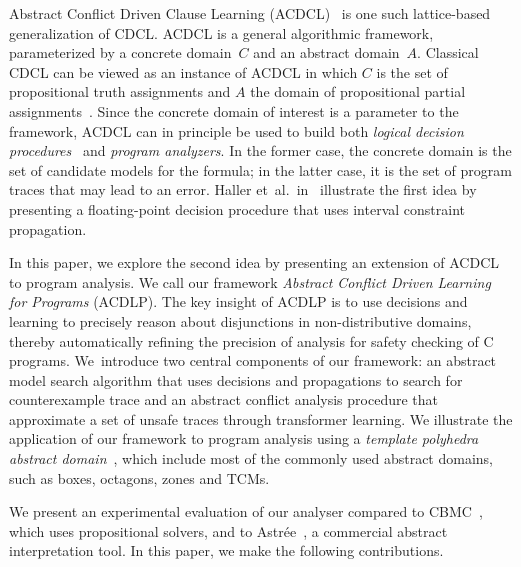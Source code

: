 Abstract Conflict Driven Clause Learning (ACDCL)~\cite{dhk2013-popl} is one
such lattice-based generalization of CDCL.  ACDCL is a general algorithmic
framework, parameterized by a concrete domain~$C$ and an abstract
domain~$A$.  Classical CDCL can be viewed as an instance of ACDCL in which
$C$ is the set of propositional truth assignments and $A$ the domain of
propositional partial assignments~\cite{leo-thesis}.  Since the concrete
domain of interest is a parameter to the framework, ACDCL can in principle
be used to build both \emph{logical decision
procedures}~\cite{DBLP:journals/fmsd/BrainDGHK14} and \emph{program
analyzers}.  In the former case, the concrete domain is the set of candidate
models for the formula; in the latter case, it is the set of program traces
that may lead to an error.  Haller
et~al.~in~\cite{DBLP:journals/fmsd/BrainDGHK14} illustrate the first idea by
presenting a floating-point decision procedure that uses interval constraint
propagation.


In this paper, we explore the second idea by presenting an extension of 
ACDCL to program analysis.  We call our 
framework \emph{Abstract Conflict Driven Learning for Programs}
(ACDLP).  The key insight of ACDLP is to use decisions and learning to precisely 
reason about disjunctions in non-distributive domains, thereby automatically 
refining the precision of analysis for safety checking of C programs.  
We~introduce two central components of our framework: an abstract
model search algorithm that uses decisions and propagations to 
search for counterexample trace and an abstract conflict analysis 
procedure that approximate a set of unsafe traces through transformer 
learning.
We illustrate the application of our framework to program analysis 
using a \textit{template polyhedra abstract domain}~\cite{vmcai05}, 
which include most of the commonly used abstract domains, such as boxes, 
octagons, zones and TCMs.  

We present an experimental evaluation of our analyser compared 
to CBMC~\cite{cbmc.tacas:2004}, which uses propositional solvers, and to 
Astr{\'e}e~\cite{DBLP:conf/pldi/BlanchetCCFMMMR03}, a commercial abstract 
interpretation tool.  In this paper, we make the following contributions.

